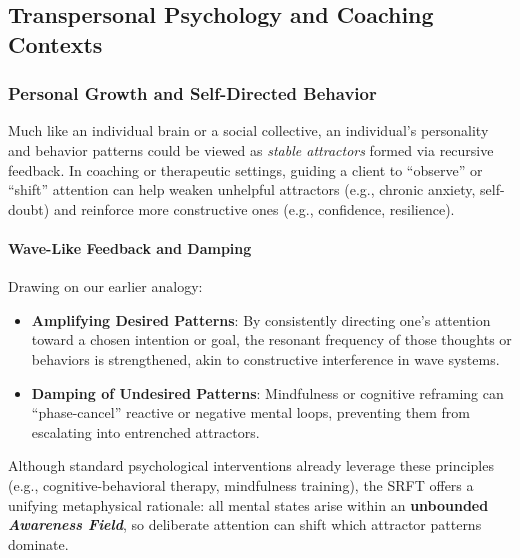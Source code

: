 \documentclass[12pt,a4paper]{article}
\begin{document}
\subsection{Transpersonal Psychology and Coaching Contexts}
\label{subsec:transpersonal-coaching}

\subsubsection{Personal Growth and Self-Directed Behavior}
Much like an individual brain or a social collective, an individual’s personality and behavior patterns could be viewed as \emph{stable attractors} formed via recursive feedback. In coaching or therapeutic settings, guiding a client to “observe” or “shift” attention can help weaken unhelpful attractors (e.g., chronic anxiety, self-doubt) and reinforce more constructive ones (e.g., confidence, resilience).

\paragraph{Wave-Like Feedback and Damping}
Drawing on our earlier analogy:
\begin{itemize}
    \item \textbf{Amplifying Desired Patterns}: By consistently directing one’s attention toward a chosen intention or goal, the resonant frequency of those thoughts or behaviors is strengthened, akin to constructive interference in wave systems.
    \item \textbf{Damping of Undesired Patterns}: Mindfulness or cognitive reframing can “phase-cancel” reactive or negative mental loops, preventing them from escalating into entrenched attractors.
\end{itemize}
Although standard psychological interventions already leverage these principles (e.g., cognitive-behavioral therapy, mindfulness training), the SRFT offers a unifying metaphysical rationale: all mental states arise within an \textbf{unbounded \emph{Awareness Field}}, so deliberate attention can shift which attractor patterns dominate.
\end{document}
